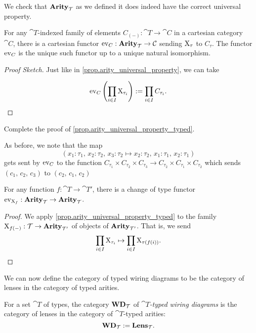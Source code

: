 \documentclass[DynamicalBook]{subfiles}
\begin{document}
We check that $\textbf{Arity}_{\mathcal{T}}$ as we defined it does indeed have the correct
universal property.
\begin{proposition}\label{prop.arity_universal_property_typed}
  For any $\cat{T}$-indexed family of elements $C_{(-)} : \cat{T} \to \cat{C}$
  in a cartesian category $\cat{C}$, there is a cartesian functor $\mathrm{ev}_C :
  \textbf{Arity}_{\mathcal{T}} \to \mathcal{C}$ sending $\mathrm{X}_{\tau}$ to $C_{\tau}$. The functor
  $\mathrm{ev}_C$ is the unique such functor up to a unique natural isomorphism.
\end{proposition}
\begin{proof}[Proof Sketch]
  Just like in \cref{prop.arity_universal_property}, we can take

  $$\mathrm{ev}_C\left( \prod_{i \in I} \mathrm{X}_{\tau_i} \right) :=
  \prod_{i \in I} C_{\tau_i}.$$

\end{proof}
\begin{exercise}
  Complete the proof of \cref{prop.arity_universal_property_typed}.
\end{exercise}

As before, we note that the map
$$(x_1 : \tau_1,\, x_2 : \tau_2,\, x_3 : \tau_2 \mapsto x_2 : \tau_2,\, x_1 :
\tau_1,\, x_2 : \tau_1)$$
gets sent by $\mathrm{ev}_C$ to the function $C_{\tau_1} \times C_{\tau_2} \times C_{\tau_3} \to
C_{\tau_2} \times C_{\tau_1} \times C_{\tau_2}$ which sends $(c_1,\, c_2,\, c_3)$ to
$(c_2,\, c_1,\, c_2)$

\begin{corollary}\label{cor.arity_change_of_types}
  For any function $f : \cat{T} \to \cat{T'}$, there is a change of type functor
  $\mathrm{ev}_{\mathrm{X}_f} : \textbf{Arity}_{\mathcal{T}} \to \textbf{Arity}_{\mathcal{T}}$.
\end{corollary}
\begin{proof}
  We apply \cref{prop.arity_universal_property_typed} to the family $\mathrm{X}_{f(-)}
  : \mathcal{T} \to \textbf{Arity}_{\mathcal{T'}}$ of objects of $\textbf{Arity}_{\mathcal{T'}}$. That is,
  we send
  $$\prod_{i \in I} \mathrm{X}_{\tau_i} \mapsto \prod_{i \in I} \mathrm{X}_{\tau({f(i))}}.\qedhere$$
\end{proof}

We can now define the category of typed wiring diagrams to be the category of
lenses in the category of typed arities.
\begin{definition}
  For a set $\cat{T}$ of types, the category $\textbf{WD}_{\mathcal{T}}$ of \emph{$\cat{T}$-typed wiring diagrams}
  is the category of lenses in the category of $\cat{T}$-typed arities:
  $$\textbf{WD}_{\mathcal{T}} := \textbf{Lens}_{\mathcal{T}}.$$
\end{definition}
\end{document}
